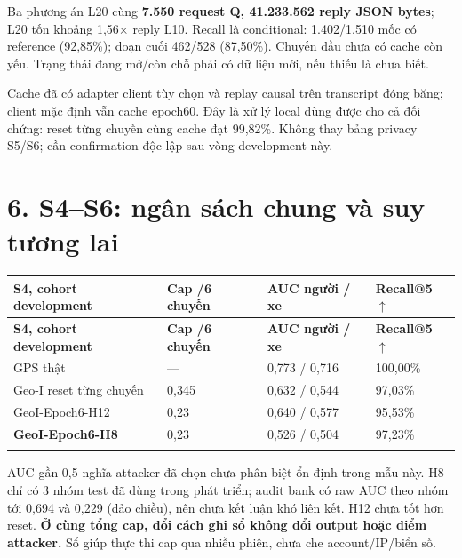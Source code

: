 \documentclass[11pt,a4paper]{article}
\begin{document}
Ba phương án L20 cùng \textbf{7.550 request Q, 41.233.562 reply JSON bytes}; L20 tốn khoảng 1,56$\times$ reply L10. Recall là conditional: 1.402/1.510 mốc có reference (92,85\%); đoạn cuối 462/528 (87,50\%). Chuyến đầu chưa có cache còn yếu. Trạng thái đang mở/còn chỗ phải có dữ liệu mới, nếu thiếu là chưa biết.

Cache đã có adapter client tùy chọn và replay causal trên transcript đóng băng; client mặc định vẫn cache epoch60. Đây là xử lý local dùng được cho cả đối chứng: reset từng chuyến cùng cache đạt 99,82\%. Không thay bảng privacy S5/S6; cần confirmation độc lập sau vòng development này.

\clearpage
\section*{6. S4–S6: ngân sách chung và suy tương lai}
\begingroup\small
\begin{longtable}{@{}P{6.315cm}P{2.786cm}P{4.086cm}P{3.343cm}@{}}
\toprule
\textbf{S4, cohort development} & \textbf{Cap /6 chuyến} & \textbf{AUC người / xe} & \textbf{Recall@5 $\uparrow$}\\\midrule
\endfirsthead
\toprule
\textbf{S4, cohort development} & \textbf{Cap /6 chuyến} & \textbf{AUC người / xe} & \textbf{Recall@5 $\uparrow$}\\\midrule
\endhead\bottomrule\endfoot
GPS thật & — & 0,773 / 0,716 & 100,00\%\\
\addlinespace[2pt]
Geo-I reset từng chuyến & 0,345 & 0,632 / 0,544 & 97,03\%\\
\addlinespace[2pt]
GeoI-Epoch6-H12 & 0,23 & 0,640 / 0,577 & 95,53\%\\
\addlinespace[2pt]
\textbf{GeoI-Epoch6-H8} & 0,23 & 0,526 / 0,504 & 97,23\%\\
\addlinespace[2pt]
\end{longtable}
\endgroup
AUC gần 0,5 nghĩa attacker đã chọn chưa phân biệt ổn định trong mẫu này. H8 chỉ có 3 nhóm test đã dùng trong phát triển; audit bank có raw AUC theo nhóm tới 0,694 và 0,229 (đảo chiều), nên chưa kết luận khó liên kết. H12 chưa tốt hơn reset. \textbf{Ở cùng tổng cap, đổi cách ghi sổ không đổi output hoặc điểm attacker.} Sổ giúp thực thi cap qua nhiều phiên, chưa che account/IP/biển số.
\end{document}
